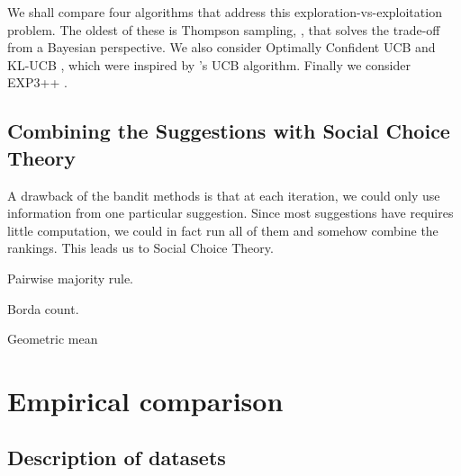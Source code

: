 \documentclass[fleqn,10pt,lineno]{wlpeerj} %
\begin{document}
We shall compare four algorithms that address this exploration-vs-exploitation
problem. The oldest of these is Thompson sampling, \citep{thompson33},
that solves the trade-off from a Bayesian
perspective. We also
consider Optimally Confident UCB \citep{lattimore15} and KL-UCB \citep{cappe13},
which were inspired by \citep{auer02}'s UCB algorithm. Finally we consider
EXP3++ \citep{seldin14}. 



\subsection*{Combining the Suggestions with Social Choice Theory}

A drawback of the bandit methods is that at each iteration, we could only use
information from one particular suggestion. Since most suggestions have
requires little computation, we could in fact run all of them and somehow
combine the rankings. This leads us to Social Choice Theory.

Pairwise majority rule.

Borda count.

Geometric mean \cite{bedo14}


\section*{Empirical comparison}

\subsection*{Description of datasets}
\end{document}
